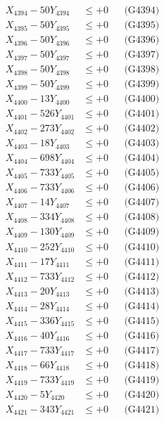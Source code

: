 \documentclass[a4paper,10pt]{article}
\begin{document}
{\begin{align}
X_{4394} - 50Y_{4394} &\leq +0 && \text{(G4394)} \\
X_{4395} - 50Y_{4395} &\leq +0 && \text{(G4395)} \\
X_{4396} - 50Y_{4396} &\leq +0 && \text{(G4396)} \\
X_{4397} - 50Y_{4397} &\leq +0 && \text{(G4397)} \\
X_{4398} - 50Y_{4398} &\leq +0 && \text{(G4398)} \\
X_{4399} - 50Y_{4399} &\leq +0 && \text{(G4399)} \\
X_{4400} - 13Y_{4400} &\leq +0 && \text{(G4400)} \\
\allowbreak
X_{4401} - 526Y_{4401} &\leq +0 && \text{(G4401)} \\
X_{4402} - 273Y_{4402} &\leq +0 && \text{(G4402)} \\
X_{4403} - 18Y_{4403} &\leq +0 && \text{(G4403)} \\
X_{4404} - 698Y_{4404} &\leq +0 && \text{(G4404)} \\
X_{4405} - 733Y_{4405} &\leq +0 && \text{(G4405)} \\
X_{4406} - 733Y_{4406} &\leq +0 && \text{(G4406)} \\
X_{4407} - 14Y_{4407} &\leq +0 && \text{(G4407)} \\
X_{4408} - 334Y_{4408} &\leq +0 && \text{(G4408)} \\
X_{4409} - 130Y_{4409} &\leq +0 && \text{(G4409)} \\
X_{4410} - 252Y_{4410} &\leq +0 && \text{(G4410)} \\
\allowbreak
X_{4411} - 17Y_{4411} &\leq +0 && \text{(G4411)} \\
X_{4412} - 733Y_{4412} &\leq +0 && \text{(G4412)} \\
X_{4413} - 20Y_{4413} &\leq +0 && \text{(G4413)} \\
X_{4414} - 28Y_{4414} &\leq +0 && \text{(G4414)} \\
X_{4415} - 336Y_{4415} &\leq +0 && \text{(G4415)} \\
X_{4416} - 40Y_{4416} &\leq +0 && \text{(G4416)} \\
X_{4417} - 733Y_{4417} &\leq +0 && \text{(G4417)} \\
X_{4418} - 66Y_{4418} &\leq +0 && \text{(G4418)} \\
X_{4419} - 733Y_{4419} &\leq +0 && \text{(G4419)} \\
X_{4420} - 5Y_{4420} &\leq +0 && \text{(G4420)} \\
\allowbreak
X_{4421} - 343Y_{4421} &\leq +0 && \text{(G4421)} \\

\end{align}}
\end{document}
